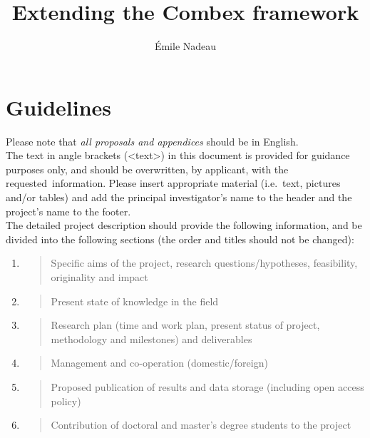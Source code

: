 \documentclass{rannis}
\title{Extending the Combex framework}
\author{\'Emile Nadeau}
\theoremstyle{definition}
\begin{document}
\newcommand{\lastpageref}{\pageref{LastPageOfDescription}}
\thispagestyle{empty}

\maketitle

\newpage

\section*{Guidelines}\label{guidelines}

\noindent
Please note that \emph{all proposals and appendices} should be in
English.\\

\noindent
The text in angle brackets (<text>) in this document is provided for guidance
purposes only, and should be overwritten, by applicant, with the \mbox{requested information}.
Please insert appropriate material (i.e.\ text, pictures and/or tables)
and add the principal investigator's name to the header and the
project's name to the footer.\\

\noindent
The detailed project description should provide the following
information, and be divided into the following sections (the order and
titles should not be changed):\\
{\it
\begin{enumerate}
\def\labelenumi{\Alph{enumi}.}
\setlength\itemsep{-0.5em}
\item
  \begin{quote}
  Specific aims of the project, research questions/hypotheses,
  feasibility, originality and impact
  \end{quote}
\item
  \begin{quote}
  Present state of knowledge in the field
  \end{quote}
\item
  \begin{quote}
  Research plan (time and work plan, present status of project,
  methodology and milestones) and deliverables
  \end{quote}
\item
  \begin{quote}
  Management and co-operation (domestic/foreign)
  \end{quote}
\item
  \begin{quote}
  Proposed publication of results and data storage (including open
  access policy)
  \end{quote}
\item
  \begin{quote}
  Contribution of doctoral and master's degree students to the
  project\\
  \end{quote}
\end{enumerate}
}
\end{document}
